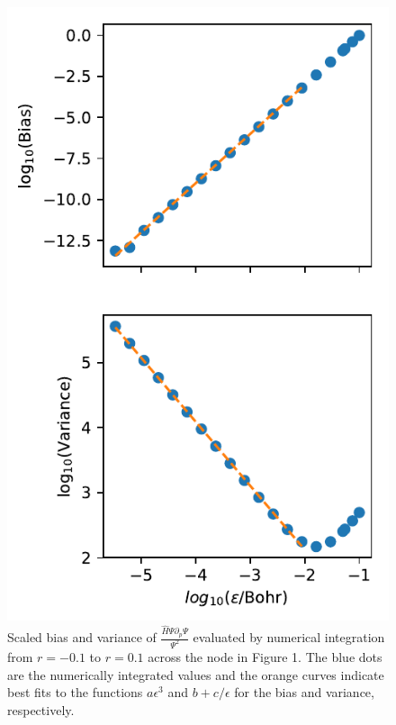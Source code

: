 \documentclass{article}
\begin{document}
\begin{figure}
\centering
\includegraphics{../2_plots/integratenode.pdf}
\caption{Scaled bias and variance of $\frac{\hat{H}\Psi \partial_p \Psi}{\Psi^2}$ evaluated by numerical integration from $r = -0.1$ to $r = 0.1$ across the node in Figure 1. The blue dots are the numerically integrated values and the orange curves indicate best fits to the functions $a\epsilon^3$ and $b + c/\epsilon$ for the bias and variance, respectively.}
\end{figure}
\end{document}
